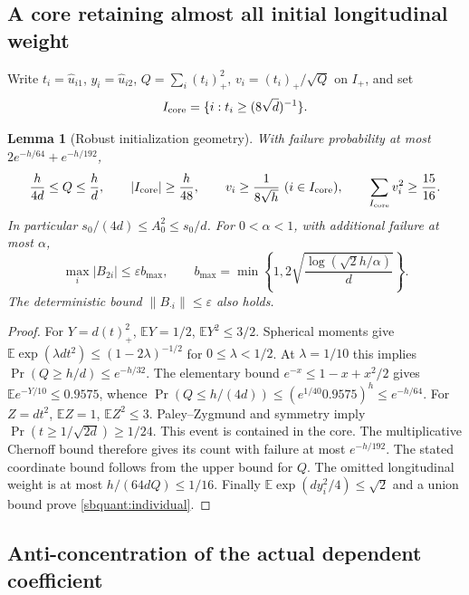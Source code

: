 \documentclass[11pt]{article}
\newtheorem{lemma}[theorem]{Lemma}
\theoremstyle{remark}
\begin{document}
\subsection{A core retaining almost all initial longitudinal weight}

Write $t_i=\widehat u_{i1}$, $y_i=\widehat u_{i2}$,
$Q=\sum_i(t_i)_+^2$, $v_i=(t_i)_+/\sqrt Q$ on $I_+$, and set
\[
 I_{\rm core}=\{i:t_i\ge(8\sqrt d)^{-1}\}.
\]
\begin{lemma}[Robust initialization geometry]\label{sbquant:core}
With failure probability at most $2e^{-h/64}+e^{-h/192}$,
\begin{equation}\label{sbquant:core-event}
 \frac{h}{4d}\le Q\le\frac hd,\qquad
 |I_{\rm core}|\ge\frac h{48},\qquad
 v_i\ge\frac1{8\sqrt h}\ (i\in I_{\rm core}),\qquad
 \sum_{I_{\rm core}}v_i^2\ge\frac{15}{16}.
\end{equation}
In particular $s_0/(4d)\le A_0^2\le s_0/d$.
For $0<\alpha<1$, with additional failure at most $\alpha$,
\begin{equation}\label{sbquant:individual}
 \max_i|B_{2i}|\le\varepsilon b_{\max},\qquad
 b_{\max}=\min\left\{1,
 2\sqrt{\frac{\log(\sqrt2h/\alpha)}d}\right\}.
\end{equation}
The deterministic bound $\|B_{\cdot i}\|\le\varepsilon$ also holds.
\end{lemma}
\begin{proof}
For $Y=d(t)_+^2$, $\mathbb EY=1/2$, $\mathbb EY^2\le3/2$.
Spherical moments give
$\mathbb E\exp(\lambda d t^2)\le(1-2\lambda)^{-1/2}$ for
$0\le\lambda<1/2$. At $\lambda=1/10$ this implies
$\Pr(Q\ge h/d)\le e^{-h/32}$.
The elementary bound $e^{-x}\le1-x+x^2/2$ gives
$\mathbb Ee^{-Y/10}\le0.9575$, whence
$\Pr(Q\le h/(4d))\le(e^{1/40}0.9575)^h\le e^{-h/64}$.
For $Z=dt^2$, $\mathbb EZ=1$, $\mathbb EZ^2\le3$.
Paley--Zygmund and symmetry imply
$\Pr(t\ge1/\sqrt{2d})\ge1/24$.
This event is contained in the core. The multiplicative Chernoff bound
therefore gives its count with failure at most $e^{-h/192}$.
The stated coordinate bound follows from the upper bound for $Q$.
The omitted longitudinal weight is at most
$h/(64dQ)\le1/16$. Finally
$\mathbb E\exp(dy_i^2/4)\le\sqrt2$ and a union bound prove
\eqref{sbquant:individual}.
\end{proof}

\subsection{Anti-concentration of the actual dependent coefficient}
\end{document}
